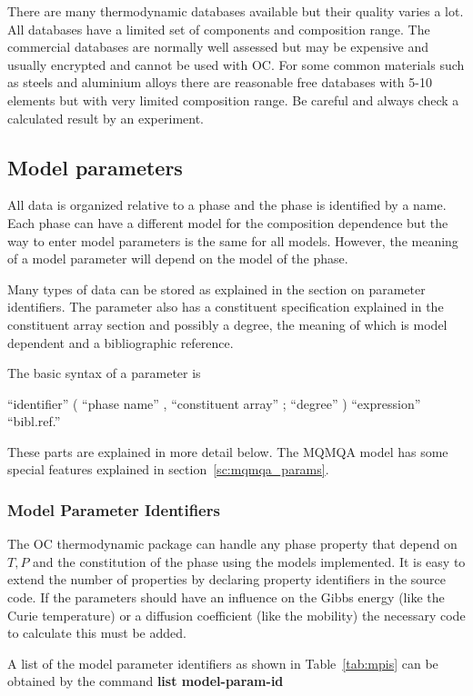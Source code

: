 \documentclass[11pt]{article}
\begin{document}
There are many thermodynamic databases available but their quality
varies a lot.  All databases have a limited set of components and
composition range.  The commercial databases are normally well
assessed but may be expensive and usually encrypted and cannot be used
with OC.  For some common materials such as steels and aluminium
alloys there are reasonable free databases with 5-10 elements but with
very limited composition range.  Be careful and always check a
calculated result by an experiment.

\subsection{Model parameters}

All data is organized relative to a phase and the phase is identified
by a name.  Each phase can have a different model for the composition
dependence but the way to enter model parameters is the same for all
models.  However, the meaning of a model parameter will depend on the
model of the phase.

Many types of data can be stored as explained in the section on
parameter identifiers.  The parameter also has a constituent
specification explained in the constituent array section and possibly
a degree, the meaning of which is model dependent and a bibliographic
reference.

The basic syntax of a parameter is

``identifier'' ( ``phase name'' , ``constituent array'' ; ``degree'' ) ``expression'' ``bibl.ref.''

These parts are explained in more detail below.  The MQMQA model has
some special features explained in section~\ref{sc:mqmqa_params}.

\subsubsection{Model Parameter Identifiers}\label{sc:paramid}

The OC thermodynamic package can handle any phase property that depend
on $T, P$ and the constitution of the phase using the models
implemented.  It is easy to extend the number of properties by
declaring property identifiers in the source code.  If the parameters
should have an influence on the Gibbs energy (like the Curie
temperature) or a diffusion coefficient (like the mobility) the
necessary code to calculate this must be added.  

A list of the model parameter identifiers as shown in
Table~\ref{tab:mpis} can be obtained by the command {\bf list
  model-param-id}
\end{document}
